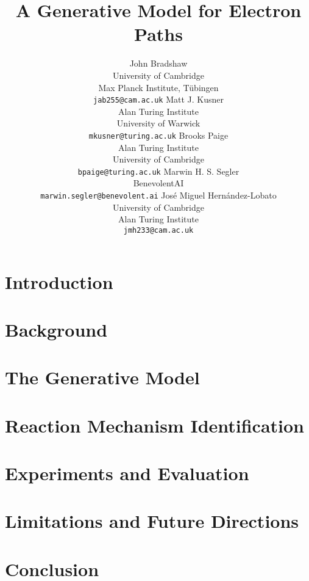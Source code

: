 \documentclass{article} %
\title{A Generative Model for Electron Paths}
\author{John Bradshaw \\ 
University of Cambridge \\
Max Planck Institute, T\"ubingen 
\\
\texttt{jab255@cam.ac.uk}
\And
Matt J. Kusner \\
Alan Turing Institute \\
University of Warwick 
\\
\texttt{mkusner@turing.ac.uk}
\And
Brooks Paige \\
Alan Turing Institute \\
University of Cambridge 
\\
\texttt{bpaige@turing.ac.uk}
\AND
Marwin H. S. Segler \\
BenevolentAI \\
\texttt{marwin.segler@benevolent.ai}
\And
Jos\'e Miguel Hern\'andez-Lobato \\
University of Cambridge \\
Alan Turing Institute \\
\texttt{jmh233@cam.ac.uk}
}
\begin{document}
\maketitle



\section{Introduction}


% 

\section{Background}






\section{The Generative Model}

\label{sec:model}




\section{Reaction Mechanism Identification}




\section{Experiments and Evaluation}





\section{Limitations and Future Directions}


\section{Conclusion}





%


\appendix
\vfill
\pagebreak

\end{document}
